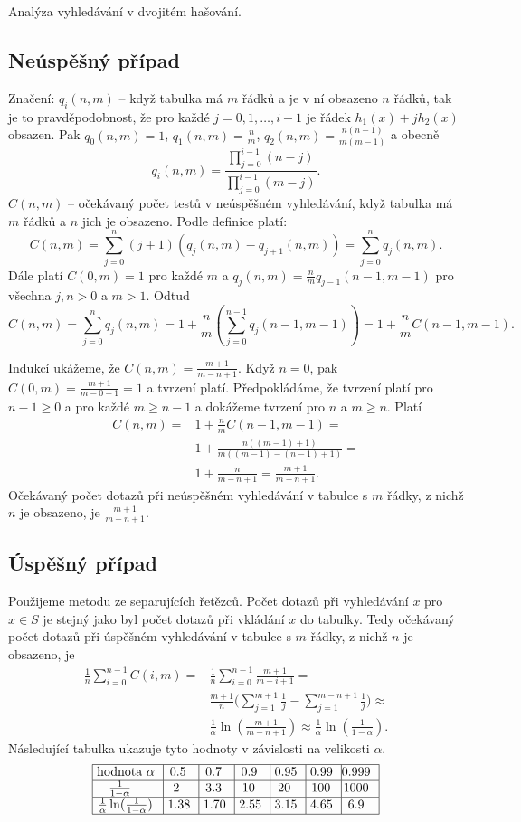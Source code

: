 \documentclass[a4paper,12pt]{article}
\begin{document}
Analýza vyhledávání v dvojitém hašování.

\subsection{
Neúspěšný případ
}

 

Značení:  $q_i(n,m)$ -- když tabulka má $m$ řádků a 
je v ní obsazeno $n$ řádků, tak je to 
pravděpodobnost, že pro každé $j=0,1,\dots,i-1$ je 
řádek $h_1(x)+jh_2(x)$ obsazen. Pak $q_0(n,m)=1$, $q_1(n,m)=\frac 
nm$, 
$q_2(n,m)=\frac {n(n-1)}{m(m-1)}$ a obecně 
$$q_i(n,m)=\frac {\prod_{j=0}^{i-1}(n-j)}{\prod_{j=0}^{i-1}(m-j)}
.$$
$C(n,m)$ -- očekávaný počet testů v neúspěšném 
vyhledávání, když tabulka má $m$ řádků a $
n$ jich 
je obsazeno. Podle definice platí:
$$C(n,m)=\sum_{j=0}^n(j+1)(q_j(n,m)-q_{j+1}(n,m))=\sum_{j=0}^nq_j
(n,m).$$
Dále platí $C(0,m)=1$ pro každé $m$ a 
$q_j(n,m)=\frac nmq_{j-1}(n-1,m-1)$ pro všechna $j,n>0$ a $m>1$. 
Odtud
$$C(n,m)=\sum_{j=0}^nq_j(n,m)=1+\frac nm(\sum_{j=0}^{n-1}q_j(n-1,
m-1))=1+\frac nmC(n-1,m-1).$$

Indukcí ukážeme, že $C(n,m)=\frac {m+1}{m-n
+1}$. Když $n=0$, pak 
$C(0,m)=\frac {m+1}{m-0+1}=1$ a tvrzení platí. Předpokládáme, že tvrzení 
platí pro $n-1\ge 0$ a pro každé $m\ge n-1$ a dokážeme tvrzení 
pro $n$ a $m\ge n$. Platí
\begin{align*} C(n,m)=&1+\frac nmC(n-1,m-1)=\\
&1+\frac {n((m-1)+1)}{m((m-1)-(n-1)+1)}=\\
&1+\frac n{m-n+1}=\frac {m+1}{m-n+1}.\end{align*}
Očekávaný počet dotazů při neúspěšném 
vyhledávání v tabulce s $m$ řádky, z nichž $n$ je obsazeno, 
je $\frac {m+1}{m-n+1}$.

\subsection{
\'Uspěšný případ
}

 

Použijeme metodu ze separujících řetězců. 
Počet dotazů při vyhledávání $x$ pro $x\in 
S$ je 
stejný jako byl počet dotazů při vkládání $
x$ do 
tabulky. Tedy očekávaný počet dotazů při 
úspěšném vyhledávání v tabulce s $m$ řádky, z nichž $
n$ je 
obsazeno, je
\begin{align*}\frac 1n\sum_{i=0}^{n-1}C(i,m)=&\frac 1n\sum_{i=0}^{n-1}\frac {
m+1}{m-i+1}=\\
&\frac {m+1}n\big(\sum_{j=1}^{m+1}\frac 1j-\sum_{j=1}^{m-n+1}\frac 
1j\big)\approx\\
&\frac 1{\alpha}\ln(\frac {m+1}{m-n+1})\approx\frac 1{\alpha}\ln(\frac 
1{1-\alpha}).\end{align*}
Následující tabulka ukazuje tyto hodnoty v závislosti na 
velikosti $\alpha$. 
$$\vtop{\offinterlineskip\halign {\strut\vrule\ # & \vrule\ # & \vrule\ # & \vrule\ # & \vrule\ # & \vrule\ # & \vrule \hfil # \hfil \vrule\cr\noalign{\hrule}hodnota $\alpha$ & 0.5 & 0.7 & 0.9 & 0.95 & 0.99 & 0.999 \hfill \cr\noalign{\hrule}$\frac 1{1-\alpha}$ & 2 & 3.3 & 10 & 20 & 100 & 1000 \cr\noalign{\hrule} $\frac 1{\alpha}\ln(\frac 1{1-\alpha})$ & 1.38 & 1.70 & 2.55 & 3.15 & 4.65 & 6.9 \cr\noalign{\hrule}}}$$
\end{document}
